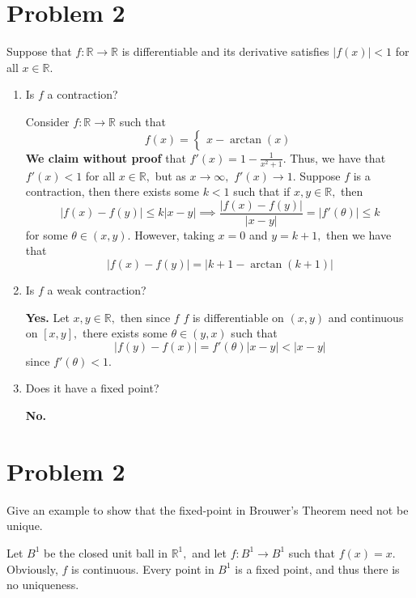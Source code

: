 \documentclass[11pt]{article}
\newcommand{\bbR}{\mathbb{R}}
\begin{document}
\section*{Problem 2}
\begin{problem}
    Suppose that $f: \bbR \to \bbR$ is differentiable and its derivative satisfies $|f(x)|< 1$ for all $x \in \bbR.$
\end{problem}
\begin{enumerate}
    \item 
    \begin{problem}
        Is $f$ a contraction?
    \end{problem}
    \begin{solution}
        Consider $f: \bbR \to \bbR$ such that 
        \[f(x) = 
        \begin{cases}
            x-\arctan(x)
        \end{cases}
        \] \textbf{We claim without proof} that $f'(x) = 1- \frac{1}{x^2 + 1}.$ Thus, we have that $f'(x)<1$ for all $x\in \bbR,$ but as $x\to \infty,$ $f'(x)\to 1.$ Suppose $f$ is a contraction, then there exists some $k<1$ such that if $x,y \in \bbR,$ then 
        \[|f(x) - f(y)| \leq k |x-y|\implies \frac{|f(x) - f(y)|}{|x-y|} = |f'(\theta)| \leq k\] for some $\theta \in (x,y).$ However, taking $x = 0$ and $y = k+1,$ then we have that 
        \[|f(x) - f(y)| = |k+1 - \arctan(k+1)|\]
    \end{solution}
    \item 
    \begin{problem}
        Is $f$ a weak contraction?
    \end{problem}
    \begin{solution}
        \textbf{Yes.} Let $x,y \in \bbR,$ then since $f$ $f$ is differentiable on $(x,y)$ and continuous on $[x,y],$ there exists some $\theta \in (y,x)$ such that 
        \[|f(y) - f(x)| = f'(\theta)|x-y|< |x-y|\] since $f'(\theta)< 1.$
    \end{solution}
    \item 
    \begin{problem}
        Does it have a fixed point?
    \end{problem}
    \begin{solution}
        \textbf{No.} 
    \end{solution}
\end{enumerate}

\newpage
\section*{Problem 2}
\begin{problem}
    Give an example to show that the fixed-point in Brouwer’s Theorem need not
 be unique.
\end{problem}
\begin{solution}
    Let $B^1$ be the closed unit ball in $\bbR^1,$ and let $f: B^1 \to B^1$ such that $f(x) = x.$ Obviously, $f$ is continuous. Every point in $B^1$ is a fixed point, and thus there is no uniqueness.
\end{solution}
\end{document}
